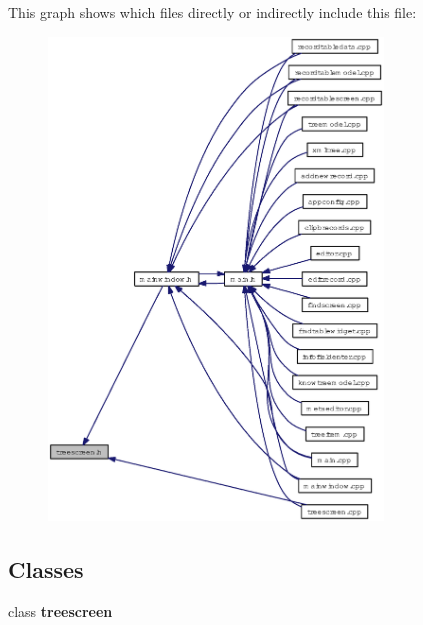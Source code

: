 This graph shows which files directly or indirectly include this file:\begin{figure}[H]
\begin{center}
\leavevmode
\includegraphics[width=252pt]{treescreen_8h__dep__incl}
\end{center}
\end{figure}
\subsection*{Classes}
\begin{CompactItemize}
\item 
class {\bf treescreen}
\end{CompactItemize}
